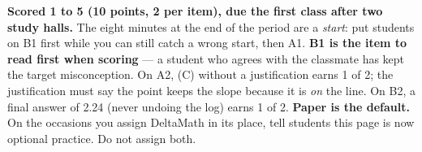 \documentclass[10pt]{article}
\begin{document}
\begin{teachernote}[Homework]
\textbf{Scored 1 to 5 (10 points, 2 per item), due the first class after two study halls.} The eight
minutes at the end of the period are a \emph{start}: put students on B1 first while you can
still catch a wrong start, then A1. \textbf{B1 is the item to read first when scoring} --- a
student who agrees with the classmate has kept the target misconception. On A2, (C) without a
justification earns 1 of 2; the justification must say the point keeps the slope because it is
\emph{on} the line. On B2, a final answer of 2.24 (never undoing the log) earns 1 of 2.
\textbf{Paper is the default.} On the occasions you assign DeltaMath in its place, tell students this page is now optional practice. Do not assign
both.
\end{teachernote}
\end{document}
